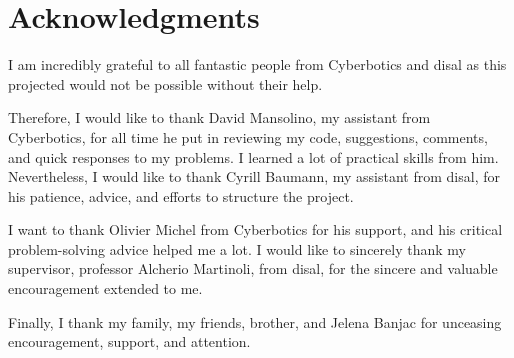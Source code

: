 \section*{Acknowledgments}

I am incredibly grateful to all fantastic people from Cyberbotics and \ac{disal} as this projected would not be possible without their help.

Therefore, I would like to thank David Mansolino, my assistant from Cyberbotics, for all time he put in reviewing my code, suggestions, comments, and quick responses to my problems.
I learned a lot of practical skills from him.
Nevertheless, I would like to thank Cyrill Baumann, my assistant from \ac{disal}, for his patience, advice, and efforts to structure the project.

I want to thank Olivier Michel from Cyberbotics for his support, and his critical problem-solving advice helped me a lot.
I would like to sincerely thank my supervisor, professor Alcherio Martinoli, from \ac{disal}, for the sincere and valuable encouragement extended to me.

Finally, I thank my family, my friends, brother, and Jelena Banjac for unceasing encouragement, support, and attention.
